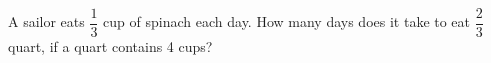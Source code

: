 A sailor eats $\dfrac{1}{3}$ cup of spinach each day. How many days does it take to eat $\dfrac{2}{3}$ quart, if a quart contains 4 cups?
